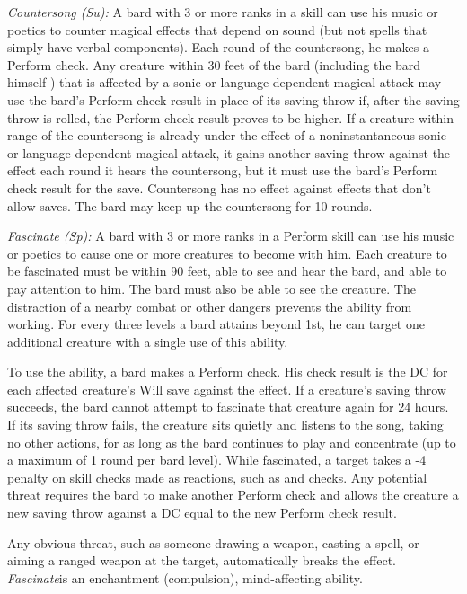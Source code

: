 \textit{Countersong (Su):} A bard with 3 or more ranks in a  skill can use his music or poetics to counter magical effects that depend on sound (but not spells that simply have verbal components). Each round of the countersong, he makes a Perform check. Any creature within 30 feet of the bard (including the bard himself ) that is affected by a sonic or language-dependent magical attack may use the bard's Perform check result in place of its saving throw if, after the saving throw is rolled, the Perform check result proves to be higher. If a creature within range of the countersong is already under the effect of a noninstantaneous sonic or language-dependent magical attack, it gains another saving throw against the effect each round it hears the countersong, but it must use the bard's Perform check result for the save. Countersong has no effect against effects that don't allow saves. The bard may keep up the countersong for 10 rounds.

\textit{Fascinate (Sp):} A bard with 3 or more ranks in a Perform skill can use his music or poetics to cause one or more creatures to become  with him. Each creature to be fascinated must be within 90 feet, able to see and hear the bard, and able to pay attention to him. The bard must also be able to see the creature. The distraction of a nearby combat or other dangers prevents the ability from working. For every three levels a bard attains beyond 1st, he can target one additional creature with a single use of this ability.

To use the ability, a bard makes a Perform check. His check result is the DC for each affected creature's Will save against the effect. If a creature's saving throw succeeds, the bard cannot attempt to fascinate that creature again for 24 hours. If its saving throw fails, the creature sits quietly and listens to the song, taking no other actions, for as long as the bard continues to play and concentrate (up to a maximum of 1 round per bard level). While fascinated, a target takes a -4 penalty on skill checks made as reactions, such as  and  checks. Any potential threat requires the bard to make another Perform check and allows the creature a new saving throw against a DC equal to the new Perform check result.

Any obvious threat, such as someone drawing a weapon, casting a spell, or aiming a ranged weapon at the target, automatically breaks the effect. \textit{Fascinate}is an enchantment (compulsion), mind-affecting ability.

